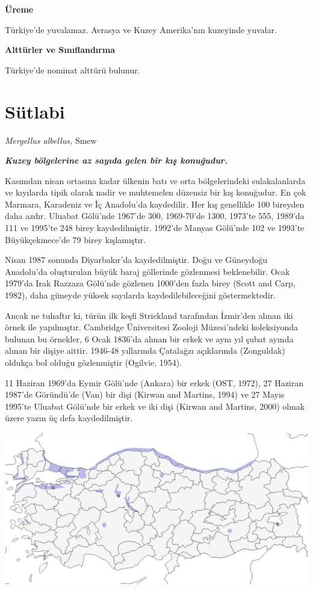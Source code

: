 \documentclass[
  a4paper,
  DIV=11,
  numbers=noendperiod]{scrartcl}
\begin{document}
\textbf{Üreme}

Türkiye'de yuvalamaz. Avrasya ve Kuzey Amerika'nın kuzeyinde yuvalar.

\textbf{Alttürler ve Sınıflandırma}

Türkiye'de nominat alttürü bulunur.

\section{Sütlabi}\label{suxfctlabi}

\emph{Mergellus albellus,} Smew

\textbf{\emph{Kuzey bölgelerine az sayıda gelen bir kış konuğudur.}}

Kasımdan nisan ortasına kadar ülkenin batı ve orta bölgelerindeki
sulakalanlarda ve kıyılarda tipik olarak nadir ve muhtemelen düzensiz
bir kış konuğudur. En çok Marmara, Karadeniz ve İç Anadolu'da
kaydedilir. Her kış genellikle 100 bireyden daha azdır. Uluabat Gölü'nde
1967'de 300, 1969-70'de 1300, 1973'te 555, 1989'da 111 ve 1995'te 248
birey kaydedilmiştir. 1992'de Manyas Gölü'nde 102 ve 1993'te
Büyükçekmece'de 79 birey kışlamıştır.

Nisan 1987 sonunda Diyarbakır'da kaydedilmiştir. Doğu ve Güneydoğu
Anadolu'da oluşturulan büyük baraj göllerinde gözlenmesi beklenebilir.
Ocak 1979'da Irak Razzaza Gölü'nde gözlenen 1000'den fazla birey (Scott
and Carp, 1982), daha güneyde yüksek sayılarda kaydedilebileceğini
göstermektedir.

Ancak ne tuhaftır ki, türün ilk keşfi Strickland tarafından İzmir'den
alınan iki örnek ile yapılmıştır. Cambridge Üniversitesi Zooloji
Müzesi'ndeki koleksiyonda bulunan bu örnekler, 6 Ocak 1836'da alınan bir
erkek ve aynı yıl şubat ayında alınan bir dişiye aittir. 1946-48
yıllarında Çatalağzı açıklarında (Zonguldak) oldukça bol olduğu
gözlenmiştir (Ogilvie, 1954).

11 Haziran 1969'da Eymir Gölü'nde (Ankara) bir erkek (OST, 1972), 27
Haziran 1987'de Göründü'de (Van) bir dişi (Kirwan and Martins, 1994) ve
27 Mayıs 1995'te Uluabat Gölü'nde bir erkek ve iki dişi (Kirwan and
Martins, 2000) olmak üzere yazın üç defa kaydedilmiştir.

\includegraphics{images/harita_Mergellus albellus.png}
\end{document}
